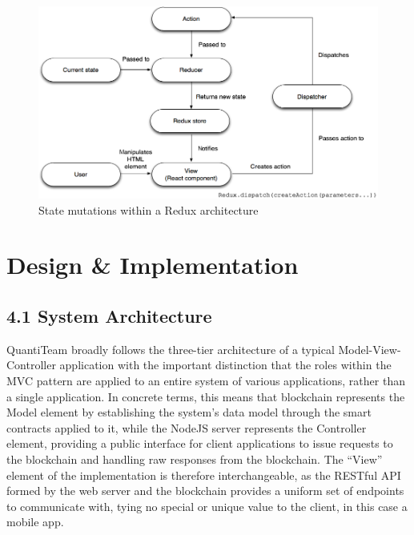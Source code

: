 \begin{figure}[htbp]
\centering
\includegraphics{../diagrams/redux.png}
\caption{State mutations within a Redux architecture\cite{1reduxibm}}
\end{figure}

\clearpage

\chapter{Design \& Implementation}

\section{4.1 System Architecture}\label{system-architecture}

QuantiTeam broadly follows the three-tier architecture of a typical
Model-View-Controller\cite{krasner1988description} application with the important distinction that the
roles within the MVC pattern are applied to an entire system of various
applications, rather than a single application. In concrete terms, this
means that blockchain represents the Model element by establishing the
system's data model through the smart contracts applied to it, while the
NodeJS server represents the Controller element, providing a public
interface for client applications to issue requests to the blockchain
and handling raw responses from the blockchain. The ``View'' element of
the implementation is therefore interchangeable, as the RESTful API
formed by the web server and the blockchain provides a uniform set of
endpoints to communicate with, tying no special or unique value to the
client, in this case a mobile app.

